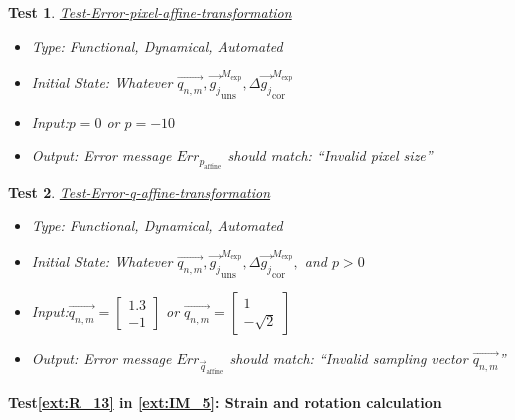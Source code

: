 \documentclass[12pt, titlepage]{article}
\newtheorem{Test}{Test}
\begin{document}
\begin{Test}\normalfont\underline{Test-Error-pixel-affine-transformation}
\label{Test-Error-pixel-affine-transformation}
\begin{itemize}
\item Type: Functional, Dynamical, Automated
\item Initial State: Whatever $\overrightarrow{q_{n,m}}, \overrightarrow{g_{j}}_{\text{uns}}^{M_{\text{exp}}}, \Delta\overrightarrow{g_{j}}_{\text{cor}}^{M_{\text{exp}}}$
\item Input:$p=0$ or $p=-10$
\item Output: Error message $Err_{p_{\text{affine}}}$ should match: \enquote{Invalid pixel size}
\end{itemize}
\end{Test}

\begin{Test}\normalfont\underline{Test-Error-q-affine-transformation}
\label{Test-Error-q-affine-transformation}
\begin{itemize}
\item Type: Functional, Dynamical, Automated
\item Initial State: Whatever $\overrightarrow{q_{n,m}}, \overrightarrow{g_{j}}_{\text{uns}}^{M_{\text{exp}}}, \Delta\overrightarrow{g_{j}}_{\text{cor}}^{M_{\text{exp}}},$ and $p>0$
\item Input:$\overrightarrow{q_{n,m}}=\begin{bmatrix}
1.3 \\
-1
\end{bmatrix}$ or $\overrightarrow{q_{n,m}}=\begin{bmatrix}
1 \\
-\sqrt{2}
\end{bmatrix}$
\item Output: Error message $Err_{\vec{q}_{\text{affine}}}$ should match: \enquote{Invalid sampling vector $\overrightarrow{q_{n,m}}$}
\end{itemize}
\end{Test}

\paragraph{Test\cref{ext:R_13} in \cref{ext:IM_5}: Strain and rotation calculation}						
\end{document}
